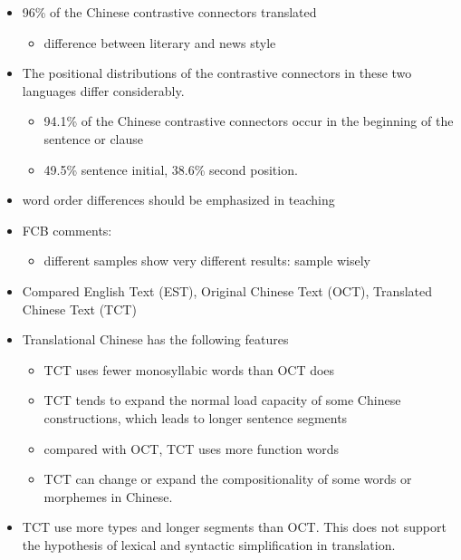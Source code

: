 \documentclass[a4paper,landscape,headrule,footrule,xetex]{foils}
\begin{document}
\begin{itemize}
\item 96\% of the Chinese contrastive connectors translated
  \begin{itemize}
  \item difference between literary and news style
  \end{itemize}
\item  The positional distributions of the contrastive connectors in
these two languages differ considerably.
\begin{itemize}
\item  94.1\% of the Chinese contrastive connectors occur in the
beginning of the sentence or clause
\item 49.5\% sentence initial, 38.6\% second position.
\end{itemize}
\item word order differences should be emphasized in teaching
\item FCB comments:
  \begin{itemize}
  \item different samples show very different results: sample wisely
  \end{itemize}
\end{itemize}



\begin{itemize}
\item Compared English Text (EST), Original Chinese Text (OCT),
  Translated Chinese Text (TCT)
\item Translational Chinese has the following features
  \begin{itemize}
  \item TCT uses fewer monosyllabic words than OCT does
  \item TCT tends to expand the normal load capacity of some Chinese constructions,
which leads to longer sentence segments
\item compared with OCT, TCT uses more function words
\item TCT can change or expand the compositionality of some words or morphemes in
Chinese.
\end{itemize}
\item TCT use more types and longer segments than OCT. This does not
  support the hypothesis of lexical and syntactic simplification in translation.
\end{itemize}
\end{document}
